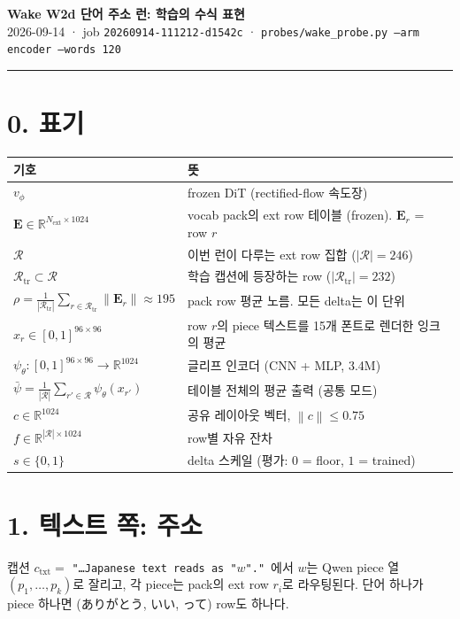 \documentclass[11pt,a4paper]{article}
\newcommand{\Emb}{\mathbf{E}}
\newcommand{\R}{\mathcal{R}}
\newcommand{\Rtr}{\mathcal{R}_{\mathrm{tr}}}
\newcommand{\norm}[1]{\left\lVert #1 \right\rVert}
\begin{document}
{\LARGE\bfseries Wake W2d 단어 주소 런: 학습의 수식 표현}\\[2pt]
{\color{note}\small 2026-09-14 · job \texttt{20260914-111212-d1542c} · \texttt{probes/wake\_probe.py --arm encoder --words 120}}

\vspace{6pt}
\hrule
\vspace{8pt}

\section*{0. 표기}

\begin{tabular}{@{}ll@{}}
\toprule
기호 & 뜻 \\
\midrule
$v_\phi$ & frozen DiT (rectified-flow 속도장) \\
$\Emb \in \mathbb{R}^{N_{\mathrm{ext}} \times 1024}$ & vocab pack의 ext row 테이블 (frozen). $\Emb_r$ = row $r$ \\
$\R$ & 이번 런이 다루는 ext row 집합 ($|\R| = 246$) \\
$\Rtr \subset \R$ & 학습 캡션에 등장하는 row ($|\Rtr| = 232$) \\
$\rho = \frac{1}{|\Rtr|}\sum_{r\in\Rtr}\norm{\Emb_r} \approx 195$ & pack row 평균 노름. 모든 delta는 이 단위 \\
$x_r \in [0,1]^{96\times96}$ & row $r$의 piece 텍스트를 15개 폰트로 렌더한 잉크의 평균 \\
$\psi_\theta : [0,1]^{96\times96} \to \mathbb{R}^{1024}$ & 글리프 인코더 (CNN + MLP, 3.4M) \\
$\bar\psi = \frac{1}{|\R|}\sum_{r'\in\R}\psi_\theta(x_{r'})$ & 테이블 전체의 평균 출력 (공통 모드) \\
$c \in \mathbb{R}^{1024}$ & 공유 레이아웃 벡터, $\norm{c}\le 0.75$ \\
$f \in \mathbb{R}^{|\R|\times 1024}$ & row별 자유 잔차 \\
$s \in \{0,1\}$ & delta 스케일 (평가: $0$ = floor, $1$ = trained) \\
\bottomrule
\end{tabular}

\section*{1. 텍스트 쪽: 주소}

캡션 $c_{\mathrm{txt}} = $ \texttt{"…Japanese text reads as "$w$"."}\ 에서 $w$는 Qwen piece 열 $(p_1,\dots,p_k)$로 잘리고, 각 piece는 pack의 ext row $r_i$로 라우팅된다. 단어 하나가 piece 하나면 (ありがとう, いい, って) row도 하나다.
\end{document}
